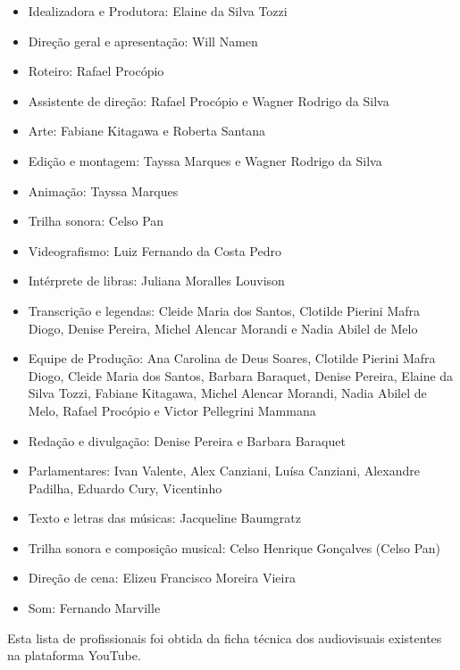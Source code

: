 \begin{itemize}
\item Idealizadora e Produtora: Elaine da Silva Tozzi
\item Direção geral e apresentação: Will Namen
\item Roteiro: Rafael Procópio
\item Assistente de direção: Rafael Procópio e Wagner Rodrigo da Silva
\item Arte: Fabiane Kitagawa e Roberta Santana
\item Edição e montagem: Tayssa Marques e Wagner Rodrigo da Silva
\item Animação: Tayssa Marques
\item Trilha sonora: Celso Pan
\item Videografismo: Luiz Fernando da Costa Pedro
\item Intérprete de libras: Juliana Moralles Louvison
\item Transcrição e legendas: Cleide Maria dos Santos, Clotilde Pierini Mafra Diogo, Denise Pereira, Michel Alencar Morandi e Nadia Abilel de Melo
\item Equipe de Produção: Ana Carolina de Deus Soares, Clotilde Pierini Mafra Diogo, Cleide Maria dos Santos, Barbara Baraquet, Denise Pereira, Elaine da Silva Tozzi, Fabiane Kitagawa, Michel Alencar Morandi, Nadia Abilel de Melo, Rafael Procópio e Victor Pellegrini Mammana
\item Redação e divulgação: Denise Pereira e Barbara Baraquet
\item Parlamentares: Ivan Valente, Alex Canziani, Luísa Canziani, Alexandre Padilha, Eduardo Cury, Vicentinho
\item Texto e letras das músicas: Jacqueline Baumgratz
\item Trilha sonora e composição musical: Celso Henrique Gonçalves (Celso Pan)
\item Direção de cena: Elizeu Francisco Moreira Vieira
\item Som: Fernando Marville
\end{itemize}

Esta lista de profissionais foi obtida da ficha técnica dos audiovisuais existentes na plataforma YouTube.




